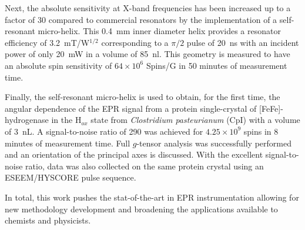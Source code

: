 Next, the absolute sensitivity at X-band frequencies has been increased up to a factor of 30 compared to commercial resonators by the implementation of a self-resonant micro-helix. This 0.4~mm inner diameter helix provides a resonator efficiency of 3.2~mT/W$^{1/2}$ corresponding to a $\pi/2$ pulse of 20~ns with an incident power of only 20~mW in a volume of 85~nl. This geometry is measured to have an absolute spin sensitivity of $64 \times 10^6$ Spins/G in 50 minutes of measurement time.  

Finally, the self-resonant micro-helix is used to obtain, for the first time, the angular dependence of the EPR signal from a protein single-crystal of [FeFe]-hydrogenase in the H$_{ox}$ state from {\em Clostridium pasteurianum} (CpI) with a volume of 3~nL. A signal-to-noise ratio of 290 was achieved for $4.25 \times 10^9$ spins in 8 minutes of measurement time. Full $g$-tensor analysis was successfully performed and an orientation of the principal axes is discussed. With the excellent signal-to-noise ratio, data was also collected on the same protein crystal using an ESEEM/HYSCORE pulse sequence.

In total, this work pushes the stat-of-the-art in EPR instrumentation allowing for new methodology development and broadening the applications available to chemists and physicists.